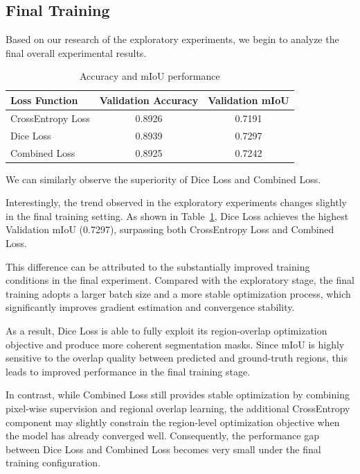\subsection{Final Training}
Based on our research of the exploratory experiments, we begin to analyze the final overall experimental results.
\begin{table}[H]
\centering
\caption{Accuracy and mIoU performance}
\label{tab:loss_ablation2}
\begin{tabular}{l c c} %
\toprule
Loss Function & Validation Accuracy & Validation mIoU \\
\midrule
CrossEntropy Loss & 0.8926 & 0.7191 \\ %
Dice Loss & 0.8939 & 0.7297 \\
Combined Loss & 0.8925 & 0.7242 \\ %
\bottomrule
\end{tabular}
\end{table}
We can similarly observe the superiority of Dice Loss and Combined Loss.

Interestingly, the trend observed in the exploratory experiments changes slightly in the final training setting. As shown in Table~\ref{tab:loss_ablation2}, Dice Loss achieves the highest Validation mIoU (0.7297), surpassing both CrossEntropy Loss and Combined Loss.

This difference can be attributed to the substantially improved training conditions in the final experiment. Compared with the exploratory stage, the final training adopts a larger batch size and a more stable optimization process, which significantly improves gradient estimation and convergence stability.

As a result, Dice Loss is able to fully exploit its region-overlap optimization objective and produce more coherent segmentation masks. Since mIoU is highly sensitive to the overlap quality between predicted and ground-truth regions, this leads to improved performance in the final training stage.

In contrast, while Combined Loss still provides stable optimization by combining pixel-wise supervision and regional overlap learning, the additional CrossEntropy component may slightly constrain the region-level optimization objective when the model has already converged well. Consequently, the performance gap between Dice Loss and Combined Loss becomes very small under the final training configuration.

